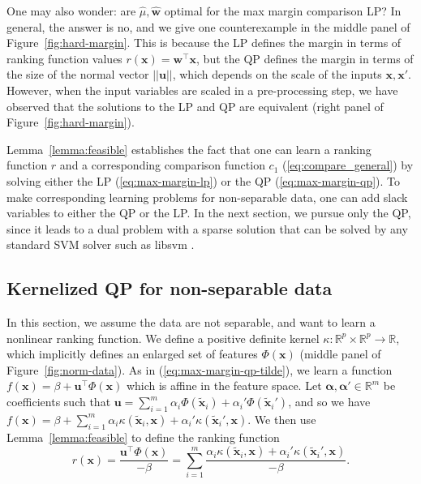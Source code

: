 \documentclass[twoside,11pt]{article}
\newcommand{\RR}{\mathbb R}
\begin{document}
One may also wonder: are $\hat \mu,\mathbf{\hat w}$ optimal for the
max margin comparison LP? In general, the answer is no, and we give
one counterexample in the middle panel of
Figure~\ref{fig:hard-margin}. This is because the LP defines the
margin in terms of ranking function values $r(\mathbf x)=\mathbf
w^\intercal \mathbf x$, but the QP defines the margin in terms of the
size of the normal vector $||\mathbf u||$, which depends on the scale
of the inputs $\mathbf x,\mathbf x'$. However, when the input
variables are scaled in a pre-processing step, we have observed that
the solutions to the LP and QP are equivalent (right panel of
Figure~\ref{fig:hard-margin}).

Lemma~\ref{lemma:feasible} establishes the fact that one can learn a
ranking function $r$ and a corresponding comparison function $c_1$
(\ref{eq:compare_general}) by solving either the LP
(\ref{eq:max-margin-lp}) or the QP (\ref{eq:max-margin-qp}). To make
corresponding learning problems for non-separable data, one can add
slack variables to either the QP or the LP. In the next section, we
pursue only the QP, since it leads to a dual problem with a sparse
solution that can be solved by any standard SVM solver such as libsvm
\citep{libsvm}.

\subsection{Kernelized QP for non-separable data}
\label{sec:kernelized-qp}
In this section, we assume the data are not separable, and want to
learn a nonlinear ranking function. We define a positive definite
kernel $\kappa:\RR^p\times \RR^p\rightarrow\RR$, which implicitly
defines an enlarged set of features $\Phi(\mathbf x)$ (middle panel of
Figure~\ref{fig:norm-data}). As in (\ref{eq:max-margin-qp-tilde}), we
learn a function $f(\mathbf x)=\beta + \mathbf u^\intercal
\Phi(\mathbf x)$ which is affine in the feature space. Let $\mathbf
\alpha,\mathbf \alpha'\in\RR^m$ be coefficients such that $\mathbf
u=\sum_{i=1}^m
\alpha_i \Phi(\mathbf{\tilde x}_i) + 
\alpha_i' \Phi(\mathbf{\tilde x}_i')$, and so we have
 $f(\mathbf x) =\beta + \sum_{i=1}^m 
 \alpha_i \kappa(\mathbf{\tilde x}_i, \mathbf x) +
 \alpha_i' \kappa(\mathbf{\tilde x}_i', \mathbf x)$. 
 We then use Lemma~\ref{lemma:feasible} to
define the ranking function
\begin{equation}
  \label{eq:kernelized_r}
  r(\mathbf x)= \frac{\mathbf u^\intercal \Phi(\mathbf x)}{-\beta} = 
  \sum_{i=1}^m
  \frac{
    \alpha_i \kappa(\mathbf{\tilde x}_i, \mathbf x) +
    \alpha_i'  \kappa(\mathbf{\tilde x}_i', \mathbf x)}
{-\beta}.
\end{equation}
\end{document}
